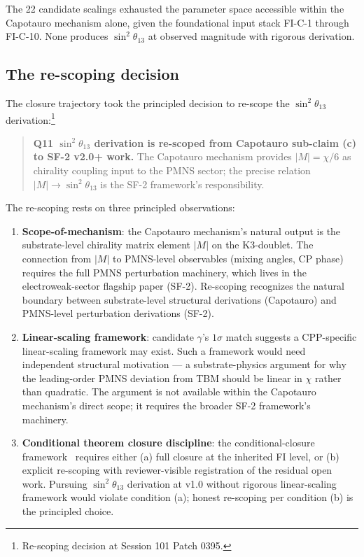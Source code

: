 \documentclass[11pt,letterpaper]{article}
\begin{document}
The 22 candidate scalings exhausted the parameter space accessible within the Capotauro mechanism alone, given the foundational input stack FI-C-1 through FI-C-10. None produces $\sin^2\theta_{13}$ at observed magnitude with rigorous derivation.

\subsection{The re-scoping decision}\label{sec:rescoping_decision}

The closure trajectory took the principled decision to re-scope the $\sin^2\theta_{13}$ derivation:\footnote{Re-scoping decision at Session 101 Patch 0395.}
\begin{quote}
\textbf{Q11 $\sin^2\theta_{13}$ derivation is re-scoped from Capotauro sub-claim (c) to SF-2 v2.0+ work.} The Capotauro mechanism provides $|M| = \chi/6$ as chirality coupling input to the PMNS sector; the precise relation $|M| \to \sin^2\theta_{13}$ is the SF-2 framework's responsibility.
\end{quote}

The re-scoping rests on three principled observations:

\begin{enumerate}\setlength\itemsep{0.2em}
    \item \textbf{Scope-of-mechanism}: the Capotauro mechanism's natural output is the substrate-level chirality matrix element $|M|$ on the K3-doublet. The connection from $|M|$ to PMNS-level observables (mixing angles, CP phase) requires the full PMNS perturbation machinery, which lives in the electroweak-sector flagship paper (SF-2). Re-scoping recognizes the natural boundary between substrate-level structural derivations (Capotauro) and PMNS-level perturbation derivations (SF-2).
    \item \textbf{Linear-scaling framework}: candidate $\gamma$'s $1\sigma$ match suggests a CPP-specific linear-scaling framework may exist. Such a framework would need independent structural motivation --- a substrate-physics argument for why the leading-order PMNS deviation from TBM should be linear in $\chi$ rather than quadratic. The argument is not available within the Capotauro mechanism's direct scope; it requires the broader SF-2 framework's machinery.
    \item \textbf{Conditional theorem closure discipline}: the conditional-closure framework~\cite{abshier_conditional_closure} requires either (a) full closure at the inherited FI level, or (b) explicit re-scoping with reviewer-visible registration of the residual open work. Pursuing $\sin^2\theta_{13}$ derivation at v1.0 without rigorous linear-scaling framework would violate condition (a); honest re-scoping per condition (b) is the principled choice.
\end{enumerate}
\end{document}
